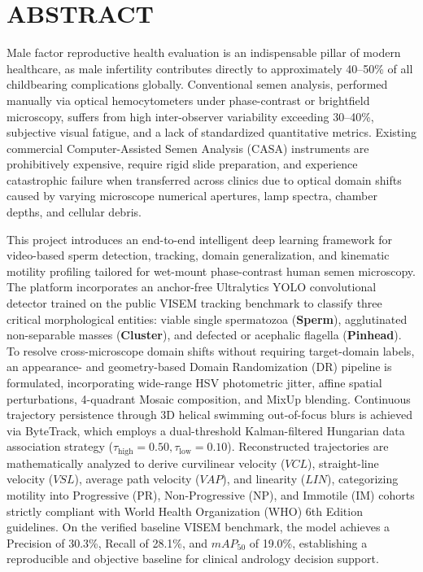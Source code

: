 \documentclass[12pt,a4paper]{report}
\begin{document}
\newpage
{}
\setcounter{page}{1}

\chapter*{ABSTRACT}
Male factor reproductive health evaluation is an indispensable pillar of modern healthcare, as male infertility contributes directly to approximately 40--50\% of all childbearing complications globally. Conventional semen analysis, performed manually via optical hemocytometers under phase-contrast or brightfield microscopy, suffers from high inter-observer variability exceeding 30--40\%, subjective visual fatigue, and a lack of standardized quantitative metrics. Existing commercial Computer-Assisted Semen Analysis (CASA) instruments are prohibitively expensive, require rigid slide preparation, and experience catastrophic failure when transferred across clinics due to optical domain shifts caused by varying microscope numerical apertures, lamp spectra, chamber depths, and cellular debris.

This project introduces an end-to-end intelligent deep learning framework for video-based sperm detection, tracking, domain generalization, and kinematic motility profiling tailored for wet-mount phase-contrast human semen microscopy. The platform incorporates an anchor-free Ultralytics YOLO convolutional detector trained on the public VISEM tracking benchmark to classify three critical morphological entities: viable single spermatozoa (\textbf{Sperm}), agglutinated non-separable masses (\textbf{Cluster}), and defected or acephalic flagella (\textbf{Pinhead}). To resolve cross-microscope domain shifts without requiring target-domain labels, an appearance- and geometry-based Domain Randomization (DR) pipeline is formulated, incorporating wide-range HSV photometric jitter, affine spatial perturbations, 4-quadrant Mosaic composition, and MixUp blending. Continuous trajectory persistence through 3D helical swimming out-of-focus blurs is achieved via ByteTrack, which employs a dual-threshold Kalman-filtered Hungarian data association strategy ($\tau_{\text{high}} = 0.50, \tau_{\text{low}} = 0.10$). Reconstructed trajectories are mathematically analyzed to derive curvilinear velocity ($VCL$), straight-line velocity ($VSL$), average path velocity ($VAP$), and linearity ($LIN$), categorizing motility into Progressive (PR), Non-Progressive (NP), and Immotile (IM) cohorts strictly compliant with World Health Organization (WHO) 6th Edition guidelines. On the verified baseline VISEM benchmark, the model achieves a Precision of 30.3\%, Recall of 28.1\%, and $mAP_{50}$ of 19.0\%, establishing a reproducible and objective baseline for clinical andrology decision support.
\end{document}
